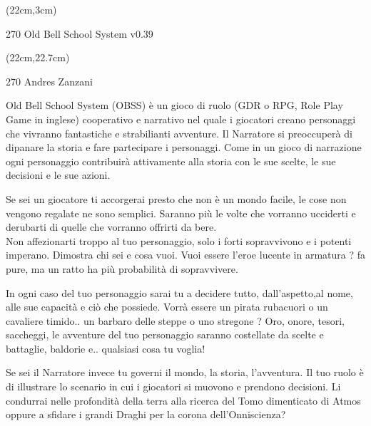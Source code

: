 \documentclass[10pt,a4paper]{article}
\def \versione {0.39}
\begin{document}
\begin{textblock*}{2cm}(22cm,3cm) %
\begin{turn}{270}
	{\Huge Old Bell School System v\versione}\\
\end{turn}
\end{textblock*}


\begin{textblock*}{2cm}(22cm,22.7cm) %
\begin{turn}{270}
	{\Huge Andres Zanzani}
\end{turn}
\end{textblock*}



Old Bell School System (OBSS) è un gioco di ruolo (GDR o RPG, Role Play Game in inglese) cooperativo e narrativo nel quale i giocatori creano personaggi che vivranno fantastiche e strabilianti avventure. Il Narratore si preoccuperà di dipanare la storia e fare partecipare i personaggi. Come in un gioco di narrazione ogni personaggio contribuirà attivamente alla storia con le sue scelte, le sue decisioni e le sue azioni.

Se sei un giocatore ti accorgerai presto che non è un mondo facile, le cose non vengono regalate ne sono semplici. Saranno più le volte che vorranno ucciderti e derubarti di quelle che vorranno offrirti da bere.\\
Non affezionarti troppo al tuo personaggio, solo i forti sopravvivono e i potenti imperano. Dimostra chi sei e cosa vuoi. Vuoi essere l'eroe lucente in armatura ? fa pure, ma un ratto ha più probabilità di sopravvivere.

In ogni caso del tuo personaggio sarai tu a decidere tutto, dall'aspetto,al nome, alle sue capacità e ciò che possiede. Vorrà essere un pirata rubacuori o un cavaliere timido.. un barbaro delle steppe o uno stregone ? Oro, onore, tesori, saccheggi, le avventure del tuo personaggio saranno costellate da scelte e battaglie, baldorie e.. qualsiasi cosa tu voglia!

Se sei il Narratore invece tu governi il mondo,  la storia, l'avventura. Il tuo ruolo è di illustrare lo scenario in cui i giocatori si muovono e prendono decisioni. Li condurrai nelle profondità della terra alla ricerca del Tomo dimenticato di Atmos oppure a sfidare i grandi Draghi per la corona dell'Onniscienza?
\end{document}
